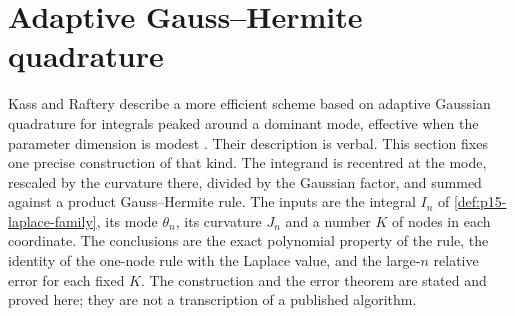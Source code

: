 \section{Adaptive Gauss--Hermite quadrature}
\label{sec:p15-w02b-p15-056-adaptive-quadrature}

Kass and Raftery describe a more efficient scheme based on adaptive
Gaussian quadrature for integrals peaked around a dominant mode, effective
when the parameter dimension is modest
\cite[Sec.~4.2, p.~779]{KassRaftery1995BayesFactors}. Their description is
verbal. This section fixes one precise construction of that kind. The
integrand is recentred at the mode, rescaled by the curvature there,
divided by the Gaussian factor, and summed against a product
Gauss--Hermite rule. The inputs are the integral \(I_n\) of
\cref{def:p15-laplace-family}, its mode \(\theta_n\), its curvature
\(J_n\) and a number \(K\) of nodes in each coordinate. The conclusions
are the exact polynomial property of the rule, the identity of the
one-node rule with the Laplace value, and the large-\(n\) relative error
for each fixed \(K\). The construction and the error theorem are stated
and proved here; they are not a transcription of a published algorithm.

